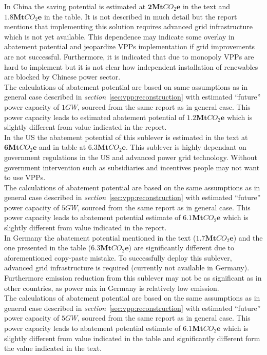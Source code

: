 \documentclass[11pt, twocolumn]{article}
\begin{document}
In China the saving potential is estimated at $\mathbf{2} \mathbf{Mt}CO_2\mathbf{e}$ in the text and $\mathbf{1.8} \mathbf{Mt}CO_2\mathbf{e}$ in the table. It is not described in much detail but the report mentions that implementing this solution requires advanced grid infrastructure which is not yet available. This dependence may indicate some overlay in abatement potential and jeopardize VPPs implementation if grid improvements are not successful. Furthermore, it is indicated that due to monopoly VPPs are hard to implement but it is not clear how independent installation of renewables are blocked by Chinese power sector.\\
The calculations of abatement potential are based on same assumptions as in general case described in \emph{section}~\ref{sec:vpp:reconstruction} with estimated ``future'' power capacity of $1GW$, sourced from the same report as in general case. This power capacity leads to estimated abatement potential of $\mathbf{1.2} \mathbf{Mt}CO_2\mathbf{e}$ which is slightly different from value indicated in the report.\\

In the US the abatement potential of this sublever is estimated in the text at $\mathbf{6} \mathbf{Mt}CO_2\mathbf{e}$ and in table at $\mathbf{6.3} \mathbf{Mt}CO_2\mathbf{e}$. This sublever is highly dependant on government regulations in the US and advanced power grid technology. Without government intervention such as subsidiaries and incentives people may not want to use VPPs.\\
The calculations of abatement potential are based on the same assumptions as in general case described in \emph{section}~\ref{sec:vpp:reconstruction} with estimated ``future'' power capacity of $5GW$, sourced from the same report as in general case. This power capacity leads to abatement potential estimate of $\mathbf{6.1} \mathbf{Mt}CO_2\mathbf{e}$ which is slightly different from value indicated in the report.\\

In Germany the abatement potential mentioned in the text ($\mathbf{1.7} \mathbf{Mt}CO_2\mathbf{e}$) and the one presented in the table ($\mathbf{6.3} \mathbf{Mt}CO_2\mathbf{e}$) are significantly different due to aforementioned copy-paste mistake. To successfully deploy this sublever, advanced grid infrastructure is required (currently not available in Germany). Furthermore emission reduction from this sublever may not be as significant as in other countries, as power mix in Germany is relatively low emission.\\
The calculations of abatement potential are based on the same assumptions as in general case described in \emph{section}~\ref{sec:vpp:reconstruction} with estimated ``future'' power capacity of $5GW$, sourced from the same report as in general case. This power capacity leads to abatement potential estimate of $\mathbf{6.1} \mathbf{Mt}CO_2\mathbf{e}$ which is slightly different from value indicated in the table and significantly different form the value indicated in the text.\\
\end{document}
